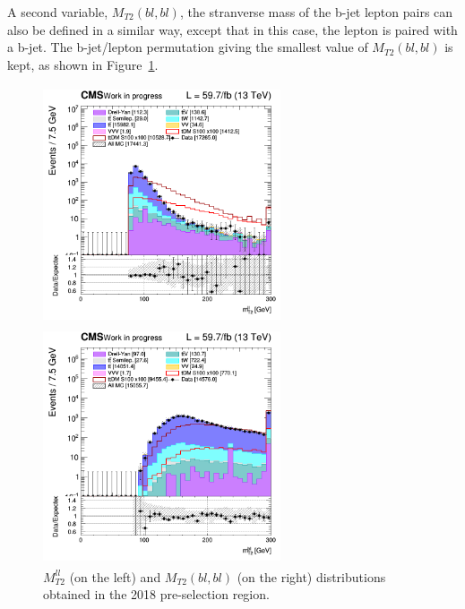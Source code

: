 \documentclass[a4paper, 10pt, openright]{report}
\begin{document}
A second variable, $M_{T2}(bl, bl)$, the stranverse mass of the b-jet lepton pairs can also be defined in a similar way, except that in this case, the lepton is paired with a b-jet. The b-jet/lepton permutation giving the smallest value of $M_{T2}(bl, bl)$ is kept, as shown in Figure~\ref{fig:SRdiscMT2}.


\begin{figure}[htbp]
\centering
\begin{minipage}[b]{.47\textwidth}
\includegraphics[width=7cm, height=7cm]{figs/2018/SmearSR-ttDM-scalar100/log_cratio_topCR_ll_mt2ll.png}
\end{minipage}\hfill
\begin{minipage}[b]{.47\textwidth}
\includegraphics[width=7cm, height=7cm]{figs/2018/SmearSR-ttDM-scalar100/log_cratio_topCR_ll_mt2bl.png}
\end{minipage}\hfill
\caption{$M_{T2}^{ll}$ (on the left) and $M_{T2}(bl, bl)$ (on the right) distributions obtained in the 2018 pre-selection region.}
\label{fig:SRdiscMT2}
\end{figure}
\end{document}
